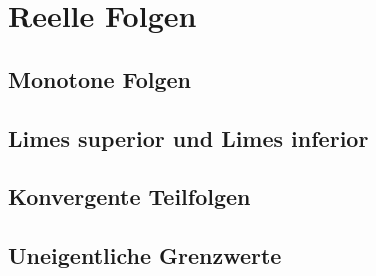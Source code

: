 \section{Reelle Folgen}
\subsection{Monotone Folgen}
\subsection{Limes superior und Limes inferior}
\subsection{Konvergente Teilfolgen}
\subsection{Uneigentliche Grenzwerte}
